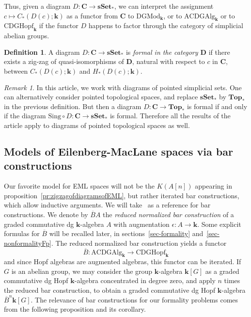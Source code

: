 \documentclass{amsart}
\theoremstyle{definition}
\newtheorem{definition}[formula]{Definition}
\theoremstyle{remark}
\newtheorem{remark}[formula]{Remark}
\newcommand{\Cc}{\mathbf{C}}
\newcommand{\Dd}{\mathbf{D}}
\newcommand{\sset}{\mathbf{sSet}}
\renewcommand{\top}{\mathbf{Top}}
\def\k{\mathbf{k}}
\begin{document}
Thus, given a diagram $D:\Cc\to \sset_*$, we can interpret the assignment $c\mapsto C_*(D(c);\k)$ as a functor from $\Cc$ to $\mathrm{DGMod}_\k$, or to $\mathrm{ACDGAlg}_\k$ or to $\mathrm{CDGHopf}_\k$ if the functor $D$ happens to factor through the category of simplicial abelian groups.

\begin{definition}
	A diagram $D:\Cc\to \sset_*$ is \emph{formal in the category $\Dd$} if there exists a zig-zag of quasi-isomorphisms of $\Dd$, natural with respect to $c$ in $\Cc$, between $C_*(D(c);\k)$ and $H_*(D(c);\k)$.
\end{definition}

\begin{remark}
In this article, we work with diagrams of pointed simplicial sets. One can alternatively consider pointed topological spaces, and replace $\sset_*$ by $\top_*$ in the previous definition. But then a diagram $D\colon\Cc\to \top_*$ is formal if and only if the diagram $\mathrm{Sing}\circ D\colon\Cc\to \sset_*$ is formal. Therefore all the results of the article apply to diagrams of pointed topological spaces as well.      
\end{remark}

\subsection{Models of Eilenberg-MacLane spaces via bar constructions} 

Our favorite model for EML spaces will not be the $K(A[n])$ appearing in proposition~\ref{pr:zigzagofdiagramsofEML}, but rather iterated bar constructions, which allow inductive arguments. We will take~\cite{gu-ma-74} as a reference for bar constructions.
We denote by $\overline{B}A$ the \emph{reduced normalized bar construction} of a graded commutative dg $\k$-algebra $A$ with augmentation $\epsilon\colon A\to \k$. Some explicit formulas for $\overline{B}$ will be recalled later, in sections~\ref{sec-formality} and~\ref{sec-nonformalityFp}. The reduced normalized bar construction yields a functor 
\[
	\overline{B}\colon\mathrm{ACDGAlg}_\k\to \mathrm{CDGHopf}_\k
\]
and since Hopf algebras are augmented algebras, this functor can be iterated.
If $G$ is an abelian group, we may consider the group $\k$-algebra $\k[G]$ as a graded commutative dg Hopf $\k$-algebra concentrated in degree zero, and apply $n$ times the reduced bar construction, to obtain a graded commutative dg Hopf $\k$-algebra $\overline{B}^n \k[G]$. The relevance of bar constructions for our formality problems comes from the following proposition and its corollary. 
\end{document}
